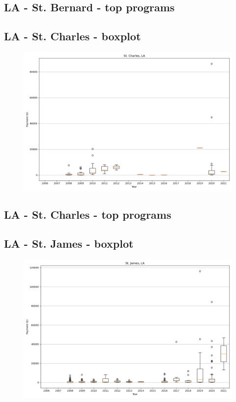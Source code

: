 \subsection*{LA - St. Bernard - top programs}

\newpage
\subsection*{LA - St. Charles - boxplot}
\begin{figure}[h]
\centering
\includegraphics[width=7in]{../output/boxplots/counties/St. Charles-LA_boxplot.png}
\end{figure}


\subsection*{LA - St. Charles - top programs}

\newpage
\subsection*{LA - St. James - boxplot}
\begin{figure}[h]
\centering
\includegraphics[width=7in]{../output/boxplots/counties/St. James-LA_boxplot.png}
\end{figure}


